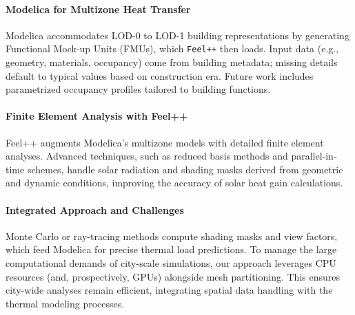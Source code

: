 \documentclass[runningheads]{llncs}
\begin{document}
\paragraph{Modelica for Multizone Heat Transfer}
Modelica accommodates LOD-0 to LOD-1 building representations by generating Functional Mock-up Units (FMUs), which \texttt{Feel++} then loads. Input data (e.g., geometry, materials, occupancy) come from building metadata; missing details default to typical values based on construction era. Future work includes parametrized occupancy profiles tailored to building functions.

\paragraph{Finite Element Analysis with Feel++}
Feel++ augments Modelica's multizone models with detailed finite element analyses. Advanced techniques, such as reduced basis methods and parallel-in-time schemes, handle solar radiation and shading masks derived from geometric and dynamic conditions, improving the accuracy of solar heat gain calculations.

\paragraph{Integrated Approach and Challenges}
Monte Carlo or ray-tracing methods compute shading masks and view factors, which feed Modelica for precise thermal load predictions. To manage the large computational demands of city-scale simulations, our approach leverages CPU resources (and, prospectively, GPUs) alongside mesh partitioning. This ensures city-wide analyses remain efficient, integrating spatial data handling with the thermal modeling processes.


\end{document}
